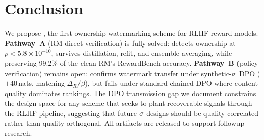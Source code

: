 \section{Conclusion}
\label{sec:conclusion}

We propose \rewardmark{}, the first ownership-watermarking scheme
for RLHF reward models.
\textbf{Pathway~A} (RM-direct verification) is fully solved:
\verifya{} detects ownership at $p<5.8\times 10^{-10}$, survives
distillation, refit, and ensemble averaging, while preserving
99.2\% of the clean RM's RewardBench accuracy.
\textbf{Pathway~B} (policy verification) remains open: \verifyc{}
confirms watermark transfer under synthetic-$\sigma$ DPO
($+40$\,nats, matching $\Delta_R/\beta$), but fails under
standard chained DPO where content quality dominates rankings. The
DPO transmission gap we document constrains the design space for
any scheme that seeks to plant recoverable signals through the
RLHF pipeline, suggesting that future $\sigma$ designs should
be quality-correlated rather than quality-orthogonal. All
artifacts are released to support followup research.
